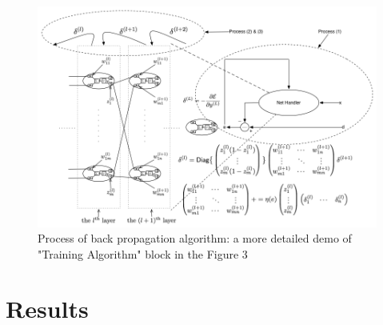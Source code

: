 \documentclass[12pt]{article}
\begin{document}
\begin{figure}[ht]
	\vspace*{-1em}
	\centering
	\includegraphics[scale=.52]{../res/BPAlgoDiagram.png}
	\caption{Process of back propagation algorithm: a more detailed demo of "Training Algorithm" block in the Figure 3}
\end{figure}

\newpage
\section*{Results}
\vspace{-20pt}
\noindent\makebox[\linewidth]{\rule{\textwidth}{0.4pt}}
\end{document}
